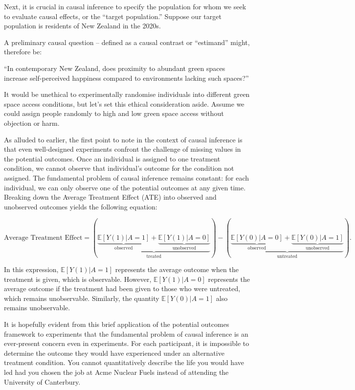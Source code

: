 \documentclass[
  singlecolumn]{article}
\begin{document}
Next, it is crucial in causal inference to specify the population for
whom we seek to evaluate causal effects, or the ``target population.''
Suppose our target population is residents of New Zealand in the 2020s.

A preliminary causal question -- defined as a causal contrast or
``estimand'' might, therefore be:

``In contemporary New Zealand, does proximity to abundant green spaces
increase self-perceived happiness compared to environments lacking such
spaces?''

It would be unethical to experimentally randomise individuals into
different green space access conditions, but let's set this ethical
consideration aside. Assume we could assign people randomly to high and
low green space access without objection or harm.

As alluded to earlier, the first point to note in the context of causal
inference is that even well-designed experiments confront the challenge
of missing values in the potential outcomes. Once an individual is
assigned to one treatment condition, we cannot observe that individual's
outcome for the condition not assigned. The fundamental problem of
causal inference remains constant: for each individual, we can only
observe one of the potential outcomes at any given time. Breaking down
the Average Treatment Effect (ATE) into observed and unobserved outcomes
yields the following equation:

\[
\text{Average Treatment Effect} = \left(\underbrace{\underbrace{\mathbb{E}[Y(1)|A = 1]}_{\text{observed}} + \underbrace{\mathbb{E}[Y(1)|A = 0]}_{\text{unobserved}}}_{\text{treated}}\right) - \left(\underbrace{\underbrace{\mathbb{E}[Y(0)|A = 0]}_{\text{observed}} + \underbrace{\mathbb{E}[Y(0)|A = 1]}_{\text{unobserved}}}_{\text{untreated}}\right).
\]

In this expression, \(\mathbb{E}[Y(1)|A = 1]\) represents the average
outcome when the treatment is given, which is observable. However,
\(\mathbb{E}[Y(1)|A = 0]\) represents the average outcome if the
treatment had been given to those who were untreated, which remains
unobservable. Similarly, the quantity \(\mathbb{E}[Y(0)|A = 1]\) also
remains unobservable.

It is hopefully evident from this brief application of the potential
outcomes framework to experiments that the fundamental problem of causal
inference is an ever-present concern even in experiments. For each
participant, it is impossible to determine the outcome they would have
experienced under an alternative treatment condition. You cannot
quantitatively describe the life you would have led had you chosen the
job at Acme Nuclear Fuels instead of attending the University of
Canterbury.
\end{document}
